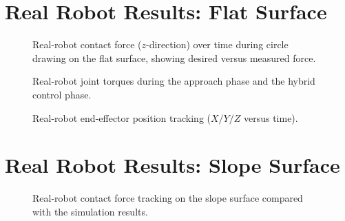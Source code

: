 \documentclass[
	german,%
	accentcolor=9c,%
	ruledheaders=section,%
	class=report,%
	thesis={type=bachelor},%
	fontsize=11pt,%
	parskip=half-,%
	custommargins=true,%
	marginpar=false,%
]{tudapub}
\begin{document}
\section{Real Robot Results: Flat Surface}


\begin{figure}[htbp]
    \centering
    \caption{Real-robot contact force ($z$-direction) over time during circle
             drawing on the flat surface, showing desired versus measured
             force.}
    \label{fig:real_force_flat}
\end{figure}

\begin{figure}[htbp]
    \centering
    \caption{Real-robot joint torques during the approach phase and the
             hybrid control phase.}
    \label{fig:real_torques}
\end{figure}

\begin{figure}[htbp]
    \centering
    \caption{Real-robot end-effector position tracking ($X/Y/Z$ versus time).}
    \label{fig:real_ee_position}
\end{figure}


\section{Real Robot Results: Slope Surface}


\begin{figure}[htbp]
    \centering
    \caption{Real-robot contact force tracking on the slope surface compared
             with the simulation results.}
    \label{fig:real_force_slope}
\end{figure}
\end{document}
